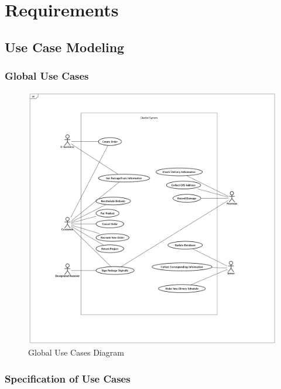 \documentclass[12pt]{scrreprt}
\begin{document}
\chapter{Requirements}
\section{Use Case Modeling}
\subsection{Global Use Cases}
\begin{figure}[H]
  \centering\includegraphics[width=5.5in]{DocumentRes/0UseCaseDiagram.png}
  \caption{Global Use Cases Diagram}
\end{figure}

\subsection{Specification of Use Cases}
\end{document}
